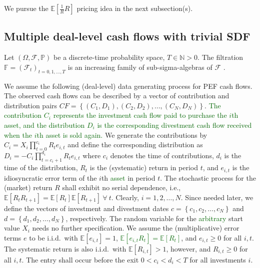 We pursue the $\mathbb{E} \left[ \frac{1}{R} R \right]$ pricing idea in the next subsection(s).


\subsection{Multiple deal-level cash flows with trivial SDF}
\label{subsec:sdf_estimation_multi_cfs_trivial_sdf}


Let $(\Omega, \mathcal{F}, \mathbb{P})$ be a discrete-time probability space, $T \in \mathbb{N}>0$.
The filtration $\mathbb{F}=(\mathcal{F}_t)_{t=0,1,\dots,T}$ is an increasing family of sub-sigma-algebras of $\mathcal{F}$ \cite[Definition 5.1]{FS16}.

We assume the following (deal-level) data generating process for PEF cash flows.
The observed cash flows can be described by a vector of contribution and distribution pairs $CF = \left\{ (C_1, D_1), (C_2, D_2), \dots, (C_N, D_N) \right\}$.
\textcolor{darkgreen}{The contribution $C_i$ represents the investment cash flow paid to purchase the $i$th asset, and the distribution $D_i$ is the corresponding divestment cash flow received when the $i$th asset is sold again.}
We generate the contributions by $C_i = X_i \prod_{t=0}^{c_i} R_t e_{i,t}$ and define the corresponding distribution as $D_i=-C_i \prod_{t=c_i+1}^{d_i} R_t e_{i,t}$ where $c_i$ denotes the time of contributions, $d_i$ is the time of the distribution, $R_t$ is the (systematic) return in period $t$, and $e_{i,t}$ is the idiosyncratic error term of the $i$th \textcolor{darkgreen}{asset} in period $t$.
The stochastic process for the (market) return $R$ shall exhibit no serial dependence, i.e., $\mathbb{E} \left[ R_{t} R_{t+1} \right] = \mathbb{E} \left[ R_{t} \right] \mathbb{E} \left[ R_{t+1} \right] \ \forall \ t$.
Clearly, $i=1,2,\dots,N$.
Since needed later, we define the vectors of investment and divestment dates $c = \left\{ c_1, c_2, \dots, c_N \right\}$ and $d = \left\{ d_1, d_2, \dots, d_N \right\}$, respectively.
The random variable for the \textcolor{darkgreen}{arbitrary} start value $X_i$ needs no further specification.
We assume the (multiplicative) error terms $e$ to be i.i.d.\ with $\mathbb{E} \left[ e_{i,t} \right]=1$, \textcolor{darkgreen}{$\mathbb{E} \left[ e_{i,t} R_{t} \right] = \mathbb{E} \left[R_{t} \right]$}, and $e_{i,t} \geq 0$ for all $i,t$.
The systematic return is also i.i.d.\ with $\mathbb{E} \left[ R_{i,t} \right]>1$, however, and $R_{i,t} \geq 0$ for all $i,t$.
The entry shall occur before the exit $0 < c_i < d_i < T$ for all investments $i$.

